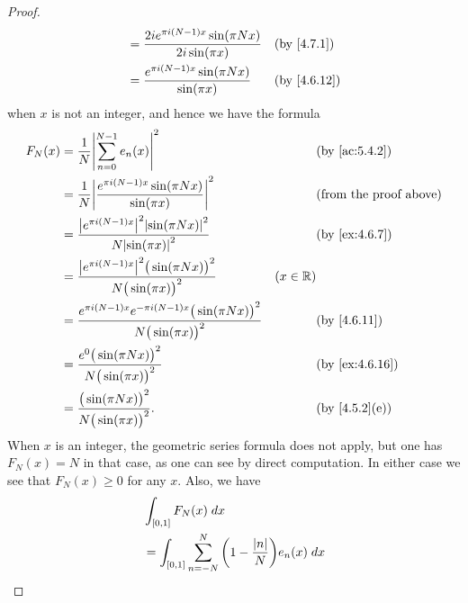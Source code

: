 \begin{proof}
\begin{align*}
                                & = \dfrac{2i e^{\pi i (N - 1) x} \sin(\pi N x)}{2i \sin(\pi x)}                                                           &  & \by{4.7.1}                   \\
                                & = \dfrac{e^{\pi i (N - 1) x} \sin(\pi N x)}{\sin(\pi x)}                                                                 &  & \text{(by \cref{4.6.12})}
  \end{align*}
  when \(x\) is not an integer, and hence we have the formula
  \begin{align*}
    F_N(x) & = \dfrac{1}{N} \abs{\sum_{n = 0}^{N - 1} e_n(x)}^2                                                       &            & \text{(by \cref{ac:5.4.2})}   \\
           & = \dfrac{1}{N} \abs{\dfrac{e^{\pi i (N - 1) x} \sin(\pi N x)}{\sin(\pi x)}}^2                            &            & \text{(from the proof above)} \\
           & = \dfrac{\abs{e^{\pi i (N - 1) x}}^2 \abs{\sin(\pi N x)}^2}{N \abs{\sin(\pi x)}^2}                       &            & \text{(by \cref{ex:4.6.7})}   \\
           & = \dfrac{\abs{e^{\pi i (N - 1) x}}^2 \big(\sin(\pi N x)\big)^2}{N \big(\sin(\pi x)\big)^2}               & (x \in \R)                                 \\
           & = \dfrac{e^{\pi i (N - 1) x} e^{- \pi i (N - 1) x} \big(\sin(\pi N x)\big)^2}{N \big(\sin(\pi x)\big)^2} &            & \text{(by \cref{4.6.11})}     \\
           & = \dfrac{e^0 \big(\sin(\pi N x)\big)^2}{N \big(\sin(\pi x)\big)^2}                                       &            & \text{(by \cref{ex:4.6.16})}  \\
           & = \dfrac{\big(\sin(\pi N x)\big)^2}{N \big(\sin(\pi x)\big)^2}.                                          &            & \text{(by \cref{4.5.2}(e))}
  \end{align*}
  When \(x\) is an integer, the geometric series formula does not apply, but one has \(F_N(x) = N\) in that case, as one can see by direct computation.
  In either case we see that \(F_N(x) \geq 0\) for any \(x\).
  Also, we have
  \begin{align*}
     & \int_{[0, 1]} F_N(x) \; dx                                                                                                                               \\
     & = \int_{[0, 1]} \sum_{n = -N}^N \bigg(1 - \dfrac{\abs{n}}{N}\bigg) e_n(x) \; dx                                                                          \\

\end{align*}
\end{proof}

